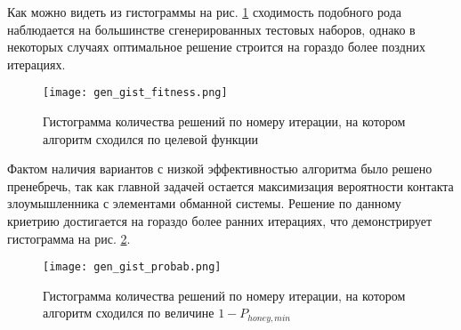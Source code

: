 Как можно видеть из гистограммы на рис. \ref{fig:gen_gist_fitness} сходимость подобного рода наблюдается на большинстве сгенерированных тестовых наборов, однако в некоторых случаях оптимальное решение строится на гораздо более поздних итерациях. 

\begin{figure}[!htbp]
\centering
	\texttt{[image: gen\_gist\_fitness.png]}  
	\caption{Гистограмма количества решений по номеру итерации, на котором алгоритм сходился по целевой функции}
	\label{fig:gen_gist_fitness}
\end{figure}

Фактом наличия вариантов с низкой эффективностью алгоритма было решено пренебречь, так как главной задачей остается максимизация вероятности контакта злоумышленника с элементами обманной системы. Решение по данному криетрию достигается на гораздо более ранних итерациях, что демонстрирует гистограмма на рис. \ref{fig:gen_gist_probab}.

\begin{figure}[ht]
\centering
	\texttt{[image: gen\_gist\_probab.png]}  
	\caption{Гистограмма количества решений по номеру итерации, на котором алгоритм сходился по величине $1 - P_{honey, min}$}
	\label{fig:gen_gist_probab}
\end{figure}